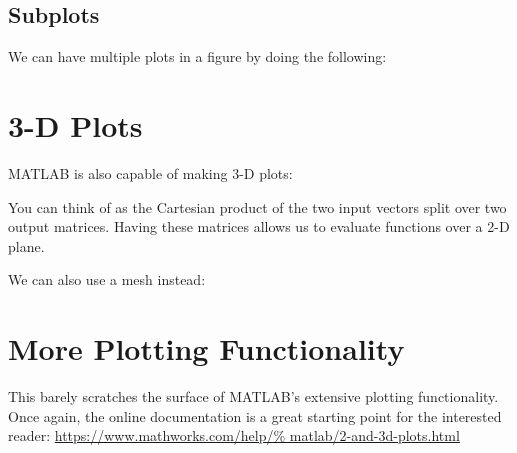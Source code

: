 \documentclass{article}
\begin{document}
\subsection{Subplots}

We can have multiple plots in a figure by doing the following:



\section{3-D Plots}

MATLAB is also capable of making 3-D plots:


You can think of  as the Cartesian product of the two input
vectors split over two output matrices.  Having these matrices allows us
to evaluate functions over a 2-D plane.

\newpage

We can also use a mesh instead:


\section{More Plotting Functionality}

This barely scratches the surface of MATLAB's extensive plotting
functionality.  Once again, the online documentation is a great starting
point for the interested reader: \url{https://www.mathworks.com/help/%
matlab/2-and-3d-plots.html}
\end{document}
